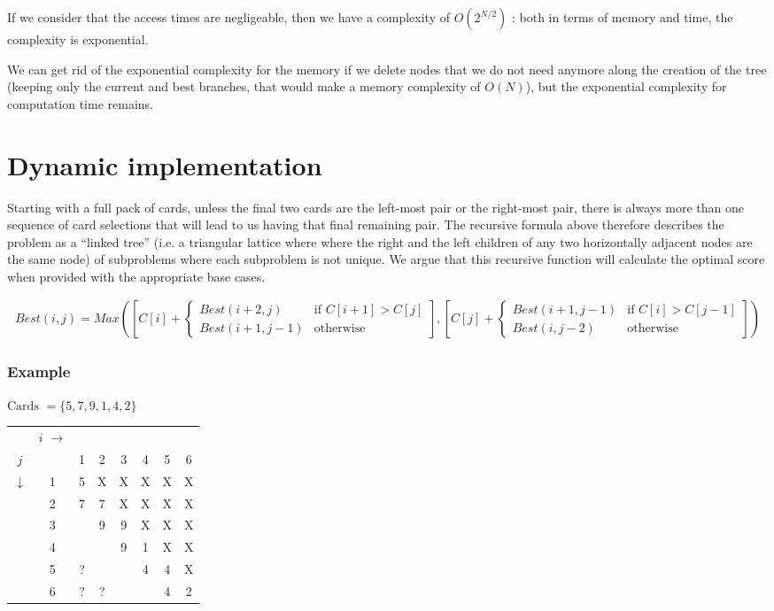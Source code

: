 \documentclass[11pt]{article}
\begin{document}
If we consider that the access times are negligeable, then we have a
complexity of $O(2^{N/2})$ : both in terms of memory and time, the
complexity is exponential.

We can get rid of the exponential complexity for the memory if we delete
nodes that we do not need anymore along the creation of the tree (keeping only
the current and best branches, that would make a memory complexity of $O(N)$), 
but the exponential complexity for computation time remains.
\section{Dynamic implementation}
Starting with a full pack of cards, unless the final two cards are the left-most pair or the right-most pair, there is always more than one sequence of card selections that will lead to us having that final remaining pair. The recursive formula above therefore describes the problem as a ``linked tree'' (i.e. a triangular lattice where where the right and the left children of any two horizontally adjacent nodes are the same node) of subproblems where each subproblem is not unique. We argue that this recursive function will calculate the optimal score when provided with the appropriate base cases.


\footnotesize
\begin{align*}
	Best(i, j) = Max\left( 
	\left[C[i] +
	\begin{cases}
		Best(i+2,j) & \text{if $C[i+1] > C[j]$} \\
		Best(i+1,j-1) & \text{otherwise}
	\end{cases}
	\right]
	,
	\left[
	C[j] +
	\begin{cases}
		Best(i+1,j-1) & \text{if $C[i] > C[j-1]$} \\
		Best(i,j-2) & \text{otherwise}
	\end{cases}
\right]
	\right)
\end{align*}
\normalsize

\subsubsection*{Example}
	$\text{Cards } = \{5,7,9,1,4,2\}$

	\begin{tabular}[c]{cc|cccccc}
		& $i$ $\rightarrow$\\

		$j$          &   & 1 & 2 & 3 & 4 & 5 & 6 \\
		             \cline{2-8}
		$\downarrow$ & 1 & 5 & X & X & X & X & X \\
		             & 2 & 7 & 7 & X & X & X & X \\
		             & 3 &   & 9 & 9 & X & X & X \\
		             & 4 &   &   & 9 & 1 & X & X \\
		             & 5 & ? &   &   & 4 & 4 & X \\
		             & 6 & ? & ? &   &   & 4 & 2
		
	\end{tabular}
\end{document}
